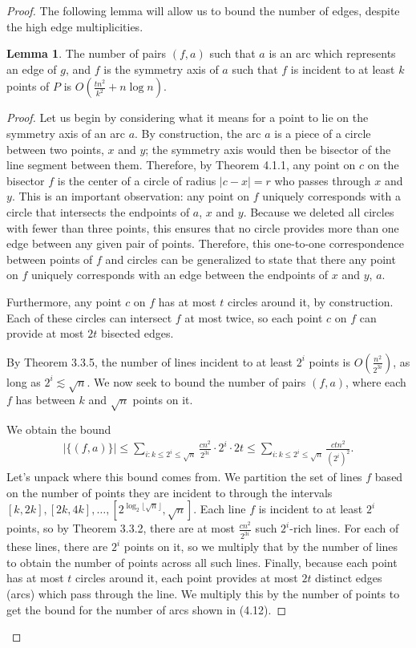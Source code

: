 \documentclass{scrippsthesisclass}
\theoremstyle{definition}
\newtheorem{lemma}[theorem]{Lemma}
\begin{document}
\begin{proof}
The following lemma will allow us to bound the number of edges, despite the high edge multiplicities. 
\begin{lemma}
    The number of pairs $(f, a)$ such that $a$ is an arc which represents an edge of $g$, and $f$ is the symmetry axis of $a$ such that $f$ is incident to at least $k$ points of $P$ is $O\left(\frac{tn^2}{k^2} + n \log n \right)$. 
\end{lemma}
\begin{proof}
    Let us begin by considering what it means for a point to lie on the symmetry axis of an arc $a$. 
    By construction, the arc $a$ is a piece of a circle between two points, $x$ and $y$; the symmetry axis would then be  bisector of the line segment between them.
    Therefore, by Theorem 4.1.1, any point on $c$ on the bisector $f$ is the center of a circle of radius $|c - x| = r$ who passes through $x$ and $y$. 
    This is an important observation: any point on $f$ uniquely corresponds with a circle that intersects the endpoints of $a$, $x$ and $y$.
    Because we deleted all circles with fewer than three points, this ensures that no circle provides more than one edge between any given pair of points. 
    Therefore, this one-to-one correspondence between points of $f$ and circles can be generalized to state that there any point on $f$ uniquely corresponds with an edge between the endpoints of $x$ and $y$, $a$. 

    Furthermore, any point $c$ on $f$ has at most $t$ circles around it, by construction. 
    Each of these circles can intersect $f$ at most twice, so each point $c$ on $f$ can provide at most $2t$ bisected edges. 
    
    By Theorem 3.3.5, the number of lines incident to at least $2^i$ points is $O\left(\frac{n^2}{2^{3i}}\right)$, as long as $2^i \lesssim \sqrt{n}$. 
    We now seek to bound the number of pairs $(f, a)$, where each $f$ has between $k$ and $\sqrt{n}$ points on it. 

    
    We obtain the bound
    \begin{align}
    |\{(f, a) \}| \leq \sum_{i: k \leq 2^i \leq \sqrt{n}} \frac{cn^2}{2^{3i}} \cdot 2^i \cdot 2t \leq \sum_{i: k \leq 2^i \leq \sqrt{n}} \frac{ctn^2}{(2^i)^2}. 
    \end{align}
    Let's unpack where this bound comes from.
    We partition the set of lines $f$ based on the number of points they are incident to through the intervals $[k, 2k], [2k, 4k], \dots, [2^{\log_2 \lfloor \sqrt{n} \rfloor}, \sqrt{n}]$.
    Each line $f$ is incident to at least $2^i$ points, so by Theorem 3.3.2, there are at most $\frac{cn^2}{2^{3i}}$ such $2^i$-rich lines. 
    For each of these lines, there are $2^i$ points on it, so we multiply that by the number of lines to obtain the number of points across all such lines.
    Finally, because each point has at most $t$ circles around it, each point provides at most $2t$ distinct edges (arcs) which pass through the line.
    We multiply this by the number of points to get the bound for the number of arcs shown in (4.12). 


\end{proof}
\end{proof}
\end{document}
